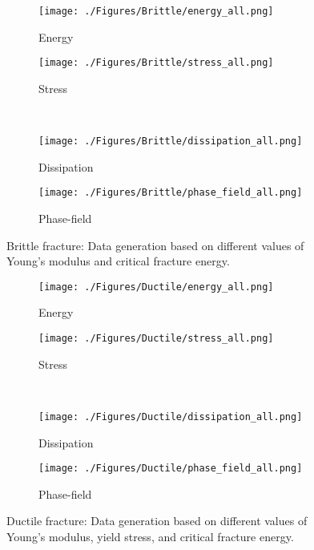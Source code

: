 \documentclass[final,3p,times]{elsarticle}
\begin{document}
%
\begin{figure}[b]%
\centering
\begin{subfigure}{0.49\linewidth}
\texttt{[image: ./Figures/Brittle/energy\_all.png]} 
\caption{Energy}
\end{subfigure}
\hfill
\begin{subfigure}{0.49\linewidth}
\texttt{[image: ./Figures/Brittle/stress\_all.png]}
\caption{Stress}
\end{subfigure}
\\[1mm]
\begin{subfigure}{0.49\linewidth}
\texttt{[image: ./Figures/Brittle/dissipation\_all.png]} 
\caption{Dissipation}
\end{subfigure}
\hfill
\begin{subfigure}{0.49\linewidth}
\texttt{[image: ./Figures/Brittle/phase\_field\_all.png]}
\caption{Phase-field}
\end{subfigure}
\vspace*{-2mm}
%
\caption{
Brittle fracture: Data generation based on different values of Young's modulus and critical fracture energy.}
\label{data-generationbrit-brittle}%
\end{figure}%
%


\begin{figure}[t]%
\centering
\begin{subfigure}{0.49\linewidth}
\texttt{[image: ./Figures/Ductile/energy\_all.png]}
\caption{Energy}
\end{subfigure}
\hfill
\begin{subfigure}{0.49\linewidth} 
\texttt{[image: ./Figures/Ductile/stress\_all.png]}
\caption{Stress}
\end{subfigure}
\\[1mm]
\begin{subfigure}{0.49\linewidth} 
\texttt{[image: ./Figures/Ductile/dissipation\_all.png]}
\caption{Dissipation}
\end{subfigure}
\hfill
\begin{subfigure}{0.49\linewidth}
\texttt{[image: ./Figures/Ductile/phase\_field\_all.png]}
\caption{Phase-field}
\end{subfigure}
\vspace*{-2mm}
%
\caption{
Ductile fracture: Data generation based on different values of Young's modulus, yield stress, and critical fracture energy.}
\label{data-generationbrit-ductile}%
\end{figure}%
%
\end{document}
